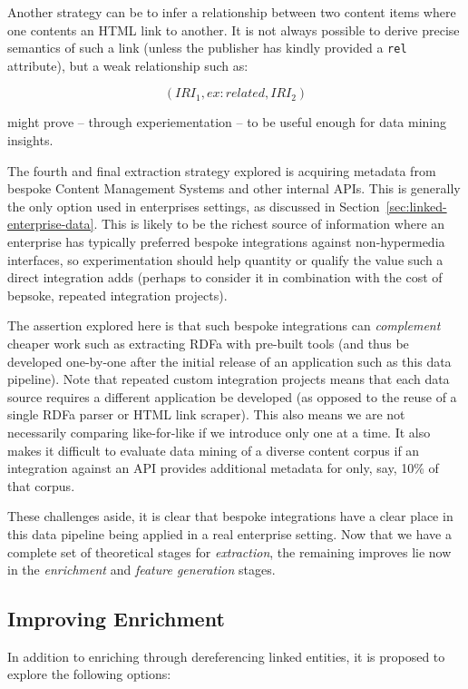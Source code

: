 Another strategy can be to infer a relationship between two content items where
one contents an HTML link to another. It is not always possible to derive
precise semantics of such a link (unless the publisher has kindly provided
a \texttt{rel} attribute), but a weak relationship such as:

$$
(IRI_1, ex:related, IRI_2)
$$

\noindent might prove -- through experiementation -- to be useful enough
for data mining insights.

The fourth and final extraction strategy explored is acquiring metadata from
bespoke Content Management Systems and other internal APIs. This is generally
the only option used in enterprises settings, as discussed in
Section~\ref{sec:linked-enterprise-data}. This is likely to be the richest
source of information where an enterprise has typically preferred bespoke
integrations against non-hypermedia interfaces, so experimentation should
help quantity or qualify the value such a direct integration adds (perhaps to
consider it in combination with the cost of bepsoke, repeated integration
projects).

The assertion explored here is that such bespoke integrations can
\emph{complement} cheaper work such as extracting RDFa with pre-built tools
(and thus be developed one-by-one after the initial release of an application
such as this data pipeline). Note that repeated custom integration projects
means that each data source requires a different application be developed (as
opposed to the reuse of a single RDFa parser or HTML link scraper). This
also means we are not necessarily comparing like-for-like if we introduce only
one at a time. It also makes it
difficult to evaluate data mining of a diverse content corpus if an integration
against an API provides additional metadata for only, say, 10\% of that corpus.

These challenges aside, it is clear that bespoke integrations have a clear place
in this data pipeline being applied in a real enterprise setting. Now that
we have a complete set of theoretical stages for \emph{extraction}, the
remaining improves lie now in the \emph{enrichment} and
\emph{feature generation} stages.

\subsection{Improving Enrichment}

In addition to enriching through dereferencing linked entities, it is proposed
to explore the following options:

